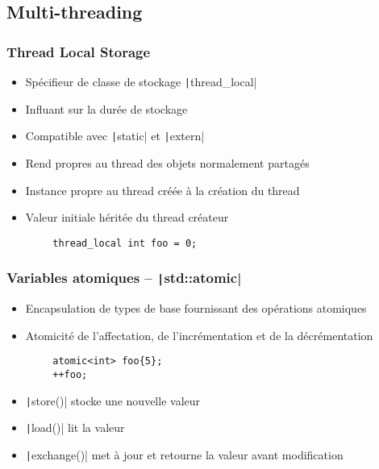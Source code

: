 \documentclass[C++.tex]{subfiles}
\begin{document}
\subsection*{Multi-threading}
\begin{frame}[fragile]
	\frametitle{Thread Local Storage}
	\begin{itemize}
		\item Spécifieur de classe de stockage \texttt|thread_local|
		\item Influant sur la durée de stockage
		\item Compatible avec \texttt|static| et \texttt|extern|
		\item Rend propres au thread des objets normalement partagés


		\item Instance propre au thread créée à la création du thread
		\item Valeur initiale héritée du thread créateur
	\end{itemize}

	\begin{verbatim}
		thread_local int foo = 0;
	\end{verbatim}

\end{frame}

\begin{frame}[fragile]
	\frametitle{Variables atomiques -- \texttt|std::atomic|}
	\begin{itemize}
		\item Encapsulation de types de base fournissant des opérations atomiques
		\item Atomicité de l'affectation, de l'incrémentation et de la décrémentation
	\end{itemize}

	\begin{verbatim}
		atomic<int> foo{5};
		++foo; 
	\end{verbatim}

	\begin{itemize}
		\item \texttt|store()| stocke une nouvelle valeur
		\item \texttt|load()| lit la valeur
		\item \texttt|exchange()| met à jour et retourne la valeur avant modification
	\end{itemize}

\end{frame}
\end{document}

